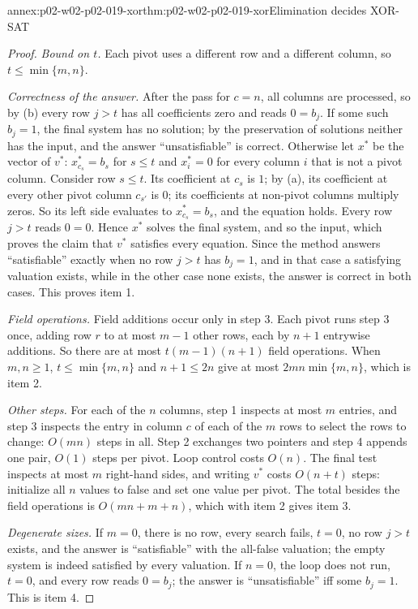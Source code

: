 \begin{annexitem}{annex:p02-w02-p02-019-xor}{thm:p02-w02-p02-019-xor}{Elimination decides XOR-SAT}
\begin{proof}
\emph{Bound on \(t\).}  Each pivot uses a different row and a different
column, so \(t\leq\min\{m,n\}\).

\emph{Correctness of the answer.}  After the pass for \(c=n\), all columns
are processed, so by (b) every row \(j>t\) has all coefficients zero and
reads \(0=b_j\).  If some such \(b_j=1\), the final system has no solution;
by the preservation of solutions neither has the input, and the answer
``unsatisfiable'' is correct.  Otherwise let \(x^{*}\) be the vector of
\(v^{*}\): \(x^{*}_{c_s}=b_s\) for \(s\leq t\) and \(x^{*}_i=0\) for every
column \(i\) that is not a pivot column.  Consider row \(s\leq t\).  Its
coefficient at \(c_s\) is \(1\); by (a), its coefficient at every other pivot
column \(c_{s'}\) is \(0\); its coefficients at non-pivot columns multiply
zeros.  So its left side evaluates to \(x^{*}_{c_s}=b_s\), and the equation
holds.  Every row \(j>t\) reads \(0=0\).  Hence \(x^{*}\) solves the final
system, and so the input, which proves the claim that \(v^{*}\) satisfies
every equation.  Since the method answers ``satisfiable'' exactly when no row
\(j>t\) has \(b_j=1\), and in that case a satisfying valuation exists, while
in the other case none exists, the answer is correct in both cases.  This
proves item 1.

\emph{Field operations.}  Field additions occur only in step 3.  Each pivot
runs step 3 once, adding row \(r\) to at most \(m-1\) other rows, each by
\(n+1\) entrywise additions.  So there are at most \(t(m-1)(n+1)\) field
operations.  When \(m,n\geq 1\), \(t\leq\min\{m,n\}\) and \(n+1\leq 2n\)
give at most \(2mn\min\{m,n\}\), which is item 2.

\emph{Other steps.}  For each of the \(n\) columns, step 1 inspects at most
\(m\) entries, and step 3 inspects the entry in column \(c\) of each of the
\(m\) rows to select the rows to change: \(O(mn)\) steps in all.  Step 2
exchanges two pointers and step 4 appends one pair, \(O(1)\) steps per
pivot.  Loop control costs \(O(n)\).  The final test inspects at most \(m\)
right-hand sides, and writing \(v^{*}\) costs \(O(n+t)\) steps: initialize
all \(n\) values to false and set one value per pivot.  The total besides
the field operations is \(O(mn+m+n)\), which with item 2 gives item 3.

\emph{Degenerate sizes.}  If \(m=0\), there is no row, every search fails,
\(t=0\), no row \(j>t\) exists, and the answer is ``satisfiable'' with the
all-false valuation; the empty system is indeed satisfied by every valuation.
If \(n=0\), the loop does not run, \(t=0\), and every row reads \(0=b_j\);
the answer is ``unsatisfiable'' iff some \(b_j=1\).  This is item 4.
\end{proof}
\end{annexitem}

